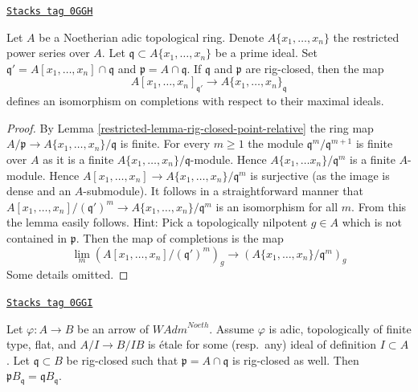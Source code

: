 \begin{lemma}
\label{restricted-lemma-rig-closed-point-variables}
\href{https://stacks.math.columbia.edu/tag/0GGH}{\texttt{Stacks tag 0GGH}}

Let $A$ be a Noetherian adic topological ring. Denote $A\{x_1, \ldots, x_n\}$
the restricted power series over $A$. Let
$\mathfrak q \subset A\{x_1, \ldots, x_n\}$ be a prime ideal.
Set $\mathfrak q' = A[x_1, \ldots, x_n] \cap \mathfrak q$ and
$\mathfrak p = A \cap \mathfrak q$. If $\mathfrak q$ and $\mathfrak p$
are rig-closed, then the map
$$
A[x_1, \ldots, x_n]_{\mathfrak q'}
\to
A\{x_1, \ldots, x_n\}_\mathfrak q
$$
defines an isomorphism on completions with respect to their maximal ideals.
\end{lemma}

\begin{proof}

By Lemma \ref{restricted-lemma-rig-closed-point-relative} the ring map
$A/\mathfrak p \to A\{x_1, \ldots, x_n\}/\mathfrak q$ is finite.
For every $m \geq 1$ the module $\mathfrak q^m/\mathfrak q^{m + 1}$
is finite over $A$ as it is a finite
$A\{x_1, \ldots, x_n\}/\mathfrak q$-module.
Hence $A\{x_1, \ldots x_n\}/\mathfrak q^m$ is a finite $A$-module.
Hence $A[x_1, \ldots, x_n] \to A\{x_1, \ldots, x_n\}/\mathfrak q^m$
is surjective (as the image is dense and an $A$-submodule).
It follows in a straightforward manner that
$A[x_1, \ldots, x_n]/(\mathfrak q')^m \to A\{x_1, \ldots, x_n\}/\mathfrak q^m$
is an isomorphism for all $m$. From this the lemma easily follows.
Hint: Pick a topologically nilpotent $g \in A$ which is not contained
in $\mathfrak p$. Then the map of completions is the map
$$
\lim_m \left(A[x_1, \ldots, x_n]/(\mathfrak q')^m\right)_g
\longrightarrow
\left(A\{x_1, \ldots, x_n\}/\mathfrak q^m\right)_g
$$
Some details omitted.
\end{proof}

\begin{lemma}
\label{restricted-lemma-rig-closed-point-etale}
\href{https://stacks.math.columbia.edu/tag/0GGI}{\texttt{Stacks tag 0GGI}}

Let $\varphi : A \to B$ be an arrow of $\textit{WAdm}^{Noeth}$.
Assume $\varphi$ is adic, topologically of finite type, flat,
and $A/I \to B/IB$ is \'etale for some (resp.\ any)
ideal of definition $I \subset A$. Let $\mathfrak q \subset B$
be rig-closed such that $\mathfrak p = A \cap \mathfrak q$
is rig-closed as well. Then
$\mathfrak p B_\mathfrak q = \mathfrak q B_\mathfrak q$.
\end{lemma}

